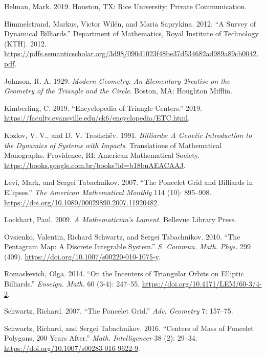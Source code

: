 \documentclass[]{article}
\begin{document}
\leavevmode\hypertarget{ref-helman19}{}%
Helman, Mark. 2019. Houston, TX: Rice University; Private Communication.

\leavevmode\hypertarget{ref-himmelstrand12}{}%
Himmelstrand, Markus, Victor Wilén, and Maria Saprykina. 2012. ``A Survey of Dynamical Billiards.'' Department of Mathematics, Royal Institute of Technology (KTH). 2012. \url{https://pdfs.semanticscholar.org/3d98/090d1023f48be37d534682ad989a89cb0042.pdf}.

\leavevmode\hypertarget{ref-johnson29}{}%
Johnson, R. A. 1929. \emph{Modern Geometry: An Elementary Treatise on the Geometry of the Triangle and the Circle}. Boston, MA: Houghton Mifflin.

\leavevmode\hypertarget{ref-etc}{}%
Kimberling, C. 2019. ``Encyclopedia of Triangle Centers.'' 2019. \url{https://faculty.evansville.edu/ck6/encyclopedia/ETC.html}.

\leavevmode\hypertarget{ref-kozlov91}{}%
Kozlov, V. V., and D. V. Treshchëv. 1991. \emph{Billiards: A Genetic Introduction to the Dynamics of Systems with Impacts}. Translations of Mathematical Monographs. Providence, RI: American Mathematical Society. \url{https://books.google.com.br/books?id=b18buAEACAAJ}.

\leavevmode\hypertarget{ref-sergei07_grid}{}%
Levi, Mark, and Sergei Tabachnikov. 2007. ``The Poncelet Grid and Billiards in Ellipses.'' \emph{The American Mathematical Monthly} 114 (10): 895--908. \url{https://doi.org/10.1080/00029890.2007.11920482}.

\leavevmode\hypertarget{ref-lockhart09}{}%
Lockhart, Paul. 2009. \emph{A Mathematician's Lament}. Bellevue Library Press.

\leavevmode\hypertarget{ref-sergei10_pentagram}{}%
Ovsienko, Valentin, Richard Schwartz, and Sergei Tabachnikov. 2010. ``The Pentagram Map: A Discrete Integrable System.'' \emph{S. Commun. Math. Phys.} 299 (409). \url{https://doi.org/10.1007/s00220-010-1075-y}.

\leavevmode\hypertarget{ref-olga14}{}%
Romaskevich, Olga. 2014. ``On the Incenters of Triangular Orbits on Elliptic Billiards.'' \emph{Enseign. Math.} 60 (3-4): 247--55. \url{https://doi.org/10.4171/LEM/60-3/4-2}.

\leavevmode\hypertarget{ref-schwartz07}{}%
Schwartz, Richard. 2007. ``The Poncelet Grid.'' \emph{Adv. Geometry} 7: 157--75.

\leavevmode\hypertarget{ref-sergei2016}{}%
Schwartz, Richard, and Sergei Tabachnikov. 2016. ``Centers of Mass of Poncelet Polygons, 200 Years After.'' \emph{Math. Intelligencer} 38 (2): 29--34. \url{https://doi.org/10.1007/s00283-016-9622-9}.
\end{document}
